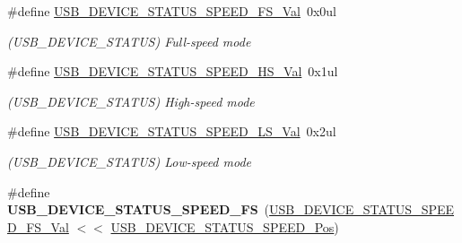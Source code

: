 \begin{DoxyCompactItemize}
\item 
\hypertarget{group___s_a_m_l21___u_s_b_ga7742b3808531475636c5d843edd9b71e}{}\#define \hyperlink{group___s_a_m_l21___u_s_b_ga7742b3808531475636c5d843edd9b71e}{U\+S\+B\+\_\+\+D\+E\+V\+I\+C\+E\+\_\+\+S\+T\+A\+T\+U\+S\+\_\+\+S\+P\+E\+E\+D\+\_\+\+F\+S\+\_\+\+Val}~0x0ul\label{group___s_a_m_l21___u_s_b_ga7742b3808531475636c5d843edd9b71e}

\begin{DoxyCompactList}\small\item\em (U\+S\+B\+\_\+\+D\+E\+V\+I\+C\+E\+\_\+\+S\+T\+A\+T\+U\+S) Full-\/speed mode \end{DoxyCompactList}\item 
\hypertarget{group___s_a_m_l21___u_s_b_ga3bf95af6a2142f4c7bb7b3dcda290d52}{}\#define \hyperlink{group___s_a_m_l21___u_s_b_ga3bf95af6a2142f4c7bb7b3dcda290d52}{U\+S\+B\+\_\+\+D\+E\+V\+I\+C\+E\+\_\+\+S\+T\+A\+T\+U\+S\+\_\+\+S\+P\+E\+E\+D\+\_\+\+H\+S\+\_\+\+Val}~0x1ul\label{group___s_a_m_l21___u_s_b_ga3bf95af6a2142f4c7bb7b3dcda290d52}

\begin{DoxyCompactList}\small\item\em (U\+S\+B\+\_\+\+D\+E\+V\+I\+C\+E\+\_\+\+S\+T\+A\+T\+U\+S) High-\/speed mode \end{DoxyCompactList}\item 
\hypertarget{group___s_a_m_l21___u_s_b_ga8a9061e2205790b27cefed8650edcd28}{}\#define \hyperlink{group___s_a_m_l21___u_s_b_ga8a9061e2205790b27cefed8650edcd28}{U\+S\+B\+\_\+\+D\+E\+V\+I\+C\+E\+\_\+\+S\+T\+A\+T\+U\+S\+\_\+\+S\+P\+E\+E\+D\+\_\+\+L\+S\+\_\+\+Val}~0x2ul\label{group___s_a_m_l21___u_s_b_ga8a9061e2205790b27cefed8650edcd28}

\begin{DoxyCompactList}\small\item\em (U\+S\+B\+\_\+\+D\+E\+V\+I\+C\+E\+\_\+\+S\+T\+A\+T\+U\+S) Low-\/speed mode \end{DoxyCompactList}\item 
\hypertarget{group___s_a_m_l21___u_s_b_ga2bba60c229542099c895987aa5b19801}{}\#define {\bfseries U\+S\+B\+\_\+\+D\+E\+V\+I\+C\+E\+\_\+\+S\+T\+A\+T\+U\+S\+\_\+\+S\+P\+E\+E\+D\+\_\+\+F\+S}~(\hyperlink{group___s_a_m_l21___u_s_b_ga7742b3808531475636c5d843edd9b71e}{U\+S\+B\+\_\+\+D\+E\+V\+I\+C\+E\+\_\+\+S\+T\+A\+T\+U\+S\+\_\+\+S\+P\+E\+E\+D\+\_\+\+F\+S\+\_\+\+Val} $<$$<$ \hyperlink{group___s_a_m_l21___u_s_b_ga07dc661773fbafdaa2c54728657332bd}{U\+S\+B\+\_\+\+D\+E\+V\+I\+C\+E\+\_\+\+S\+T\+A\+T\+U\+S\+\_\+\+S\+P\+E\+E\+D\+\_\+\+Pos})\label{group___s_a_m_l21___u_s_b_ga2bba60c229542099c895987aa5b19801}


\end{DoxyCompactItemize}
